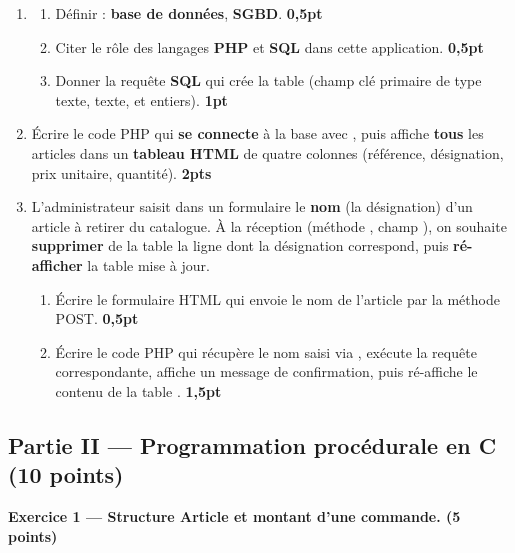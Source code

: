 \begin{enumerate}[label=\textbf{\arabic*-},leftmargin=2.2em]
\item \begin{enumerate}[label=\textbf{\alph*)},leftmargin=2em]
  \item Définir : \textbf{base de données}, \textbf{SGBD}. \hfill \textbf{0,5pt}
  \item Citer le rôle des langages \textbf{PHP} et \textbf{SQL} dans cette application. \hfill \textbf{0,5pt}
  \item Donner la requête \textbf{SQL} qui crée la table  (champ
   clé primaire de type texte,  texte,
   et  entiers). \hfill \textbf{1pt}
  \end{enumerate}
\item Écrire le code PHP qui \textbf{se connecte} à la base  avec
, puis affiche \textbf{tous} les articles dans un \textbf{tableau
HTML} de quatre colonnes (référence, désignation, prix unitaire, quantité). \hfill \textbf{2pts}
\item L'administrateur saisit dans un formulaire le \textbf{nom} (la désignation) d'un
article à retirer du catalogue. À la réception (méthode , champ
), on souhaite \textbf{supprimer} de la table  la
ligne dont la désignation correspond, puis \textbf{ré-afficher} la table mise à jour.
  \begin{enumerate}[label=\textbf{\alph*)},leftmargin=2em]
  \item Écrire le formulaire HTML qui envoie le nom de l'article par la méthode POST. \hfill \textbf{0,5pt}
  \item Écrire le code PHP qui récupère le nom saisi via , exécute la
  requête  correspondante, affiche un message de confirmation,
  puis ré-affiche le contenu de la table . \hfill \textbf{1,5pt}
  \end{enumerate}
\end{enumerate}

\subsection*{Partie II — Programmation procédurale en C \hfill (10 points)}

\textbf{Exercice 1 — Structure Article et montant d'une commande. \hfill (5 points)}

